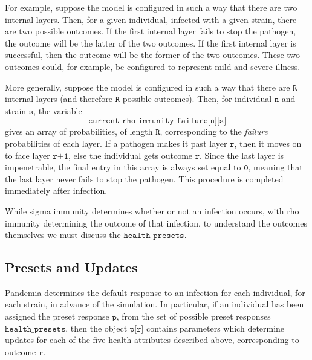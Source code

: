 \documentclass[10pt,letterpaper]{article}
\begin{document}
For example, suppose the model is configured in such a way that there are two internal layers. Then, for a given individual, infected with a given strain, there are two possible outcomes. If the first internal layer fails to stop the pathogen, the outcome will be the latter of the two outcomes. If the first internal layer is successful, then the outcome will be the former of the two outcomes. These two outcomes could, for example, be configured to represent mild and severe illness.

More generally, suppose the model is configured in such a way that there are $\texttt{R}$ internal layers (and therefore $\texttt{R}$ possible outcomes). Then, for individual $\texttt{n}$ and strain $\texttt{s}$, the variable $$\texttt{current{\_}rho{\_}immunity{\_}failure[n][s]}$$ gives an array of probabilities, of length $\texttt{R}$, corresponding to the \textit{failure} probabilities of each layer. If a pathogen makes it past layer $\texttt{r}$, then it moves on to face layer $\texttt{r+1}$, else the individual gets outcome $\texttt{r}$. Since the last layer is impenetrable, the final entry in this array is always set equal to $\texttt{0}$, meaning that the last layer never fails to stop the pathogen. This procedure is completed immediately after infection.

While sigma immunity determines whether or not an infection occurs, with rho immunity determining the outcome of that infection, to understand the outcomes themselves we must discuss the $\texttt{health{\_}presets}$.

\subsection*{Presets and Updates}

Pandemia determines the default response to an infection for each individual, for each strain, in advance of the simulation. In particular, if an individual has been assigned the preset response $\texttt{p}$, from the set of possible preset responses $\texttt{health{\_}presets}$, then the object $\texttt{p[r]}$ contains parameters which determine updates for each of the five health attributes described above, corresponding to outcome $\texttt{r}$.
\end{document}
